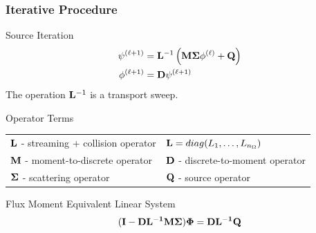 \documentclass[compress,10pt]{beamer}
\begin{document}
\begin{frame}[t]\frametitle{Iterative Procedure}

\begin{block}{Source Iteration} {\small
\begin{equation*}
\begin{aligned}
 \psi^{(\ell+1)} &= {\bf L}^{-1} \left( {\bf M} {\bf \Sigma} \phi^{(\ell)}  +  {\bf Q} \right) \\
\phi^{(\ell+1)} &= {\bf D}  \psi^{(\ell+1)}
\end{aligned}
\end{equation*}
The operation ${\bf L}^{-1}$ is a transport sweep.\\
}
\end{block}

\begin{block}{Operator Terms} {\small
\begin{tabular}{ll}
${\bf L}$ - streaming + collision operator & ${\bf L } = diag(L_1, \ldots, L_{n_\Omega})$ \\
${\bf M}$ - moment-to-discrete operator &
${\bf D}$ - discrete-to-moment operator \\
${\bf \Sigma}$ - scattering operator &
${\bf Q}$ - source operator \\
\end{tabular}
}
\end{block}

\begin{block}{Flux Moment Equivalent Linear System}
\begin{equation*}
{\bf  ( I - DL^{-1} M\Sigma) \Phi = D L^{-1} Q}
\end{equation*}
\end{block}
\end{frame}
\end{document}
